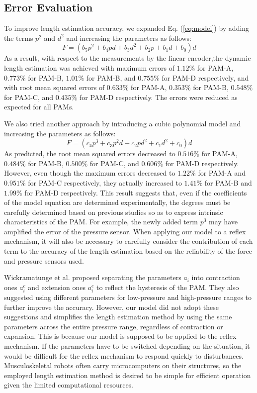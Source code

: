 \subsection{Error Evaluation}
To improve length estimation accuracy, we expanded Eq. (\ref{eq:model}) by adding the terms $p^2$ and $d^2$ and increasing the parameters as follows:
\begin{equation}
\label{eq:model_2d(1)}
F = (b_5p^2 + b_4pd + b_3d^2 + b_2p+b_1d+b_0)d
\end{equation}
As a result, with respect to the measurements by the linear encoder,the dynamic length estimation was achieved with maximum errors of $1.12\%$ for PAM-A, $0.773\%$ for PAM-B, $1.01\%$ for PAM-B, and $0.755\%$ for PAM-D respectively, and with root mean squared errors of $0.633\%$ for PAM-A, $0.353\%$ for PAM-B, $0.548\%$ for PAM-C, and $0.435\%$ for PAM-D respectively. The errors were reduced as expected for all PAMs. 

We also tried another approach by introducing a cubic polynomial model and increasing the parameters as follows:
\begin{equation}
    \label{eq:model_3d}
    F = (c_4p^3+c_3p^2d+c_2pd^2+c_1d^2+c_0)d
\end{equation}
As predicted, the root mean squared errors decreased to $0.516\%$ for PAM-A, $0.484\%$ for PAM-B, $0.500\%$ for PAM-C, and $0.606\%$ for PAM-D respectively. 
However, even though the maximum errors decreased to $1.22\%$ for PAM-A and $0.951\%$ for PAM-C respectively, they actually increased to $1.41\%$ for PAM-B and $1.99\%$ for PAM-D respectively. This result suggests that, even if the coefficients of the model equation are determined experimentally, the degrees must be carefully determined based on previous studies so as to express intrinsic characteristics of the PAM. For example, the newly added term $p^3$ may have amplified the error of the pressure sensor. When applying our model to a reflex mechanism, it will also be necessary to carefully consider the contribution of each term to the accuracy of the length estimation based on the reliability of the force and pressure sensors used.


Wickramatunge et al. proposed separating the parameters $a_i$ into contraction ones $a^c_i$ and extension ones $a^e_i$ to reflect the hysteresis of the PAM\cite{spring}. They also suggested using different parameters for low-pressure and high-pressure ranges to further improve the accuracy. However, our model did not adopt these suggestions and simplifies the length estimation method by using the same parameters across the entire pressure range, regardless of contraction or expansion. This is because our model is supposed to be applied to the reflex mechanism. If the parameters have to be switched depending on the situation, it would be difficult for the reflex mechanism to respond quickly to disturbances. Musculoskeletal robots often carry microcomputers on their structures, so the employed length estimation method is desired to be simple for efficient operation given the limited computational resources.



